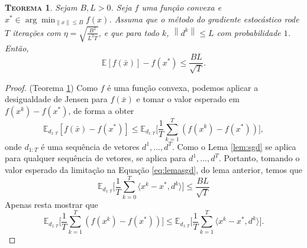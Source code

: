 \documentclass[
	12pt,				%
    oneside,			%
	a4paper,			%
	english,			%
	french,				%
	spanish,			%
	brazil,				%
	]{abntex2}
\newtheorem{theorem}{\scshape Teorema}[section]
\newcommand{\norm}[1]{\left\lVert#1\right\rVert}
\begin{document}
            \begin{theorem}\label{teo:sgd}
                Sejam $B,L > 0$. Seja $f$ uma função convexa e $x^{*} \in \arg\min_{\norm{x} \leq B}f(x)$. Assuma que o método do gradiente estocástico rode $T$ iterações com $\eta = \sqrt{\frac{B^2}{L^2 T}}$, e que para todo $k$, $\norm{d^k} \leq L$ com probabilidade $1$. Então,
                \begin{equation*}
                    \mathbb{E}[f(\bar{x})] - f(x^{*}) \leq \frac{BL}{\sqrt{T}}.
                \end{equation*}
            \end{theorem}
            \begin{proof}{(Teorema \ref{teo:sgd})}
                Como $f$ é uma função convexa, podemos aplicar a desigualdade de Jensen para $f(\bar{x})$ e tomar o valor esperado em $f(x^k) - f(x^{*})$, de forma a obter
                \begin{equation*}
                    \mathbb{E}_{d_{1:T}} [f(\bar{x}) - f(x^{*})] \leq \mathbb{E}_{d_{1:T}} \biggl[ \frac{1}{T} \sum_{k=1}^{T} (f(x^k) - f(x^{*})) \biggr],
                \end{equation*}
                onde $d_{1:T}$ é uma sequência de vetores $d^1,...,d^T$.
                Como o Lema \ref{lem:sgd} se aplica para qualquer sequência de vetores, se aplica para $d^1,...,d^T$. Portanto, tomando o valor esperado da limitação na Equação \eqref{eq:lemasgd}, do lema anterior, temos que
                \begin{equation*}
                    \mathbb{E}_{d_{1:T}} \biggl[ \frac{1}{T}\sum_{k=0}^{T}\langle x^k - x^{*}, d^k \rangle \biggr] \leq \frac{BL}{\sqrt{T}}
                \end{equation*}
                Apenas resta mostrar que
                \begin{equation}\label{eq:sgdproof}
                    \mathbb{E}_{d_{1:T}} \biggl[ \frac{1}{T} \sum_{k=1}^{T} (f(x^k) - f(x^{*})) \biggr] \leq \mathbb{E}_{d_{1:T}} \biggl[ \frac{1}{T} \sum_{k=1}^{T} \langle x^k - x^{*}, d^k \rangle \biggr].
                \end{equation}


\end{proof}
\end{document}
